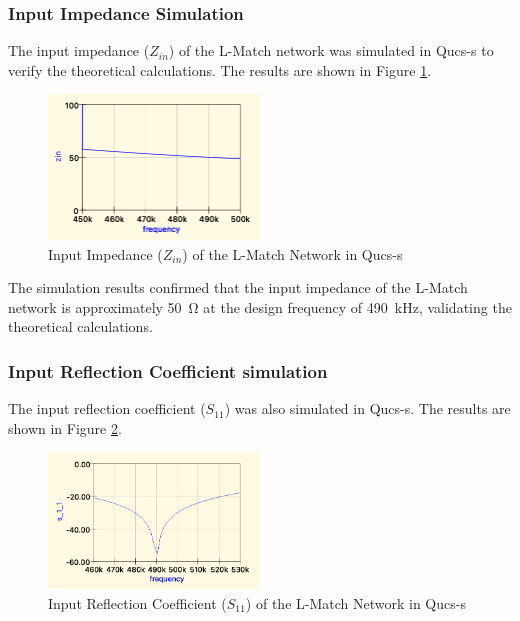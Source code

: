 \subsubsection{Input Impedance Simulation}
The input impedance ($Z_{in}$) of the L-Match network was simulated in Qucs-s to verify the theoretical calculations. The results are shown in Figure \ref{fig:qucs_zin}.

\begin{figure}[H]
    \centering
    \includegraphics[width=0.5\textwidth]{Images/Qucs_Zin.png}
    \caption{Input Impedance ($Z_{in}$) of the L-Match Network in Qucs-s}
    \label{fig:qucs_zin}
\end{figure}

The simulation results confirmed that the input impedance of the L-Match network is approximately \SI{50}{\ohm} at the design frequency of \SI{490}{\kilo\hertz}, validating the theoretical calculations.

\subsubsection{Input Reflection Coefficient simulation}

The input reflection coefficient ($S_{11}$) was also simulated in Qucs-s. The results are shown in Figure \ref{fig:qucs_s11}.

\begin{figure}[H]
    \centering
    \includegraphics[width=0.5\textwidth]{Images/Qucs_S11.png}
    \caption{Input Reflection Coefficient ($S_{11}$) of the L-Match Network in Qucs-s}
    \label{fig:qucs_s11}
\end{figure}

